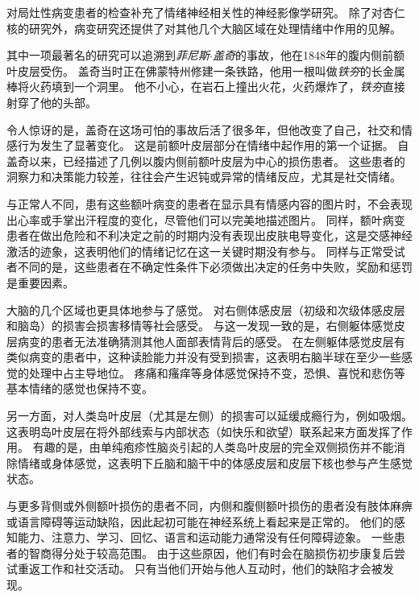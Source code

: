 \begin{proposition}[情绪损伤研究] \label{box:42_2}
	
	\quad \quad 对局灶性病变患者的检查补充了情绪神经相关性的神经影像学研究。
	除了对杏仁核的研究外，病变研究还提供了对其他几个大脑区域在处理情绪中作用的见解。
	
	\quad \quad 其中一项最著名的研究可以追溯到\textit{菲尼斯$\cdot$盖奇}的事故，他在1848年的腹内侧前额叶皮层受伤。
	盖奇当时正在佛蒙特州修建一条铁路，他用一根叫做\textit{铁夯}的长金属棒将火药填到一个洞里。
	他不小心，在岩石上撞出火花，火药爆炸了，\textit{铁夯}直接射穿了他的头部。
	
	\quad \quad 令人惊讶的是，盖奇在这场可怕的事故后活了很多年，但他改变了自己，社交和情感行为发生了显著变化。
	这是前额叶皮层部分在情绪中起作用的第一个证据。
	自盖奇以来，已经描述了几例以腹内侧前额叶皮层为中心的损伤患者。
	这些患者的洞察力和决策能力较差，往往会产生迟钝或异常的情绪反应，尤其是社交情绪。
	
	\quad \quad 与正常人不同，患有这些额叶病变的患者在显示具有情感内容的图片时，不会表现出心率或手掌出汗程度的变化，尽管他们可以完美地描述图片。
	同样，额叶病变患者在做出危险和不利决定之前的时期内没有表现出皮肤电导变化，这是交感神经激活的迹象，这表明他们的情绪记忆在这一关键时期没有参与。
	同样与正常受试者不同的是，这些患者在不确定性条件下必须做出决定的任务中失败，奖励和惩罚是重要因素。
	
	\quad \quad 大脑的几个区域也更具体地参与了感觉。
	对右侧体感皮层（初级和次级体感皮层和脑岛）的损害会损害移情等社会感受。
	与这一发现一致的是，右侧躯体感觉皮层病变的患者无法准确猜测其他人面部表情背后的感受。
	在左侧躯体感觉皮层有类似病变的患者中，这种读脸能力并没有受到损害，这表明右脑半球在至少一些感觉的处理中占主导地位。
	疼痛和瘙痒等身体感觉保持不变，恐惧、喜悦和悲伤等基本情绪的感觉也保持不变。
	
	\quad \quad 另一方面，对人类岛叶皮层（尤其是左侧）的损害可以延缓成瘾行为，例如吸烟。
	这表明岛叶皮层在将外部线索与内部状态（如快乐和欲望）联系起来方面发挥了作用。
	有趣的是，由单纯疱疹性脑炎引起的人类岛叶皮层的完全双侧损伤并不能消除情绪或身体感觉，这表明下丘脑和脑干中的体感皮层和皮层下核也参与产生感觉状态。
	
\end{proposition}


与更多背侧或外侧额叶损伤的患者不同，内侧和腹侧额叶损伤的患者没有肢体麻痹或语言障碍等运动缺陷，因此起初可能在神经系统上看起来是正常的。
他们的感知能力、注意力、学习、回忆、语言和运动能力通常没有任何障碍迹象。
一些患者的智商得分处于较高范围。
由于这些原因，他们有时会在脑损伤初步康复后尝试重返工作和社交活动。
只有当他们开始与他人互动时，他们的缺陷才会被发现。


